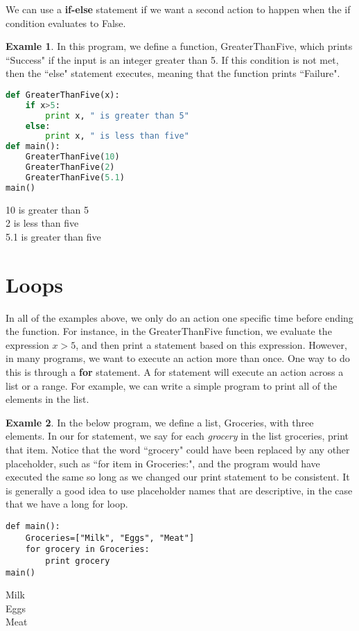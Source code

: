 \documentclass[12pt,openany]{book} %
\theoremstyle{definition}
\newtheorem{soln}{\textbf{Exam\smash{p}le} \nolinebreak }[section]
\newcounter{code}[section]
\begin{document}
We can use a \textbf{if-else} statement if we want a second action to happen when the if condition evaluates to False.  \begin{soln}  In this program, we define a function, GreaterThanFive, which prints ``Success" if the input is an integer greater than 5.  If this condition is not met, then the ``else" statement executes, meaning that the function prints ``Failure".  \end{soln}  
\begin{code}{}{}
\begin{lstlisting}[language=Python]
def GreaterThanFive(x):
	if x>5:
		print x, " is greater than 5"
	else:
		print x, " is less than five"
def main():
	GreaterThanFive(10)
	GreaterThanFive(2)
	GreaterThanFive(5.1)
main()
\end{lstlisting} \end{code}
\begin{out}{}{} 10 is greater than 5 \\ 2 is less than five \\ 5.1 is greater than five \end{out}  

\section{Loops}
In all of the examples above, we only do an action one specific time before ending the function.  For instance, in the GreaterThanFive function, we evaluate the expression $x>5$, and then print a statement based on this expression.  However, in many programs, we want to execute an action more than once.  One way to do this is through a \textbf{for} statement.  A for statement will execute an action across a list or a range.  For example, we can write a simple program to print all of the elements in the list.  
\begin{soln}  In the below program, we define a list, Groceries, with three elements.  In our for statement, we say for each \textit{grocery} in the list groceries, print that item.  Notice that the word ``grocery" could have been replaced by any other placeholder, such as ``for item in Groceries:", and the program would have executed the same so long as we changed our print statement to be consistent.  It is generally a good idea to use placeholder names that are descriptive, in the case that we have a long for loop.  \end{soln} 
\begin{code}{}{}
\begin{lstlisting}
def main():
	Groceries=["Milk", "Eggs", "Meat"]
	for grocery in Groceries:
		print grocery
main()
\end{lstlisting} \end{code}
\begin{out}{}{}  Milk \\ Eggs \\ Meat \end{out} 
\end{document}
